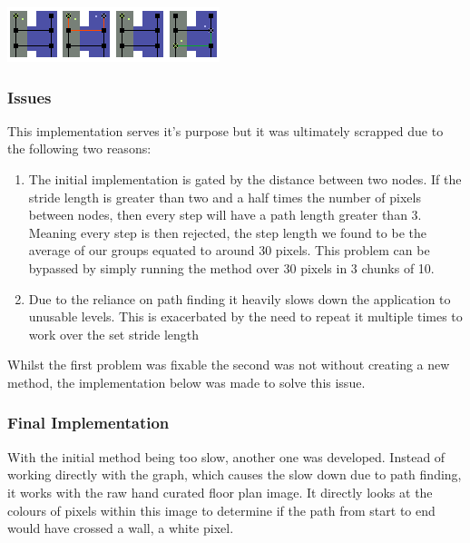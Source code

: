\documentclass[main.tex]{subfiles}
\begin{document}
\begin{center}
\includegraphics[scale=1.5]{images-implementation/collision1.png}
\label{fig:iniCol}
\end{center}

\subsubsection{Issues}

This implementation serves it's purpose but it was ultimately scrapped due to the following two reasons:

\begin{enumerate}
	\item The initial implementation is gated by the distance between two nodes. If the stride length is greater than two and a half times the number of pixels between nodes, then every step will have a path length greater than 3. Meaning every step is then rejected, the step length we found to be the average of our groups equated to around 30 pixels. This problem can be bypassed by simply running the method over 30 pixels in 3 chunks of 10.
	\item Due to the reliance on path finding it heavily slows down the application to unusable levels. This is exacerbated by the need to repeat it multiple times to work over the set stride length
\end{enumerate}

Whilst the first problem was fixable the second was not without creating a new method, the implementation below was made to solve this issue.

\subsubsection{Final Implementation}

With the initial method being too slow, another one was developed. Instead of working directly with the graph, which causes the slow down due to path finding, it works with the raw hand curated floor plan image. It directly looks at the colours of pixels within this image to determine if the path from start to end would have crossed a wall, a white pixel.
\end{document}
